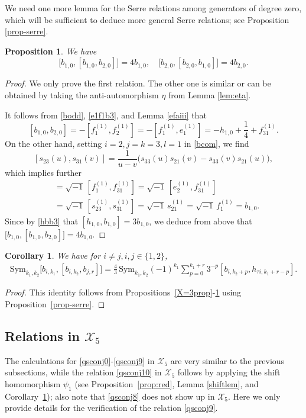 \documentclass[11pt,reqno]{amsart}
\numberwithin{equation}{section}
\newtheorem{prop}[thm]{Proposition}
\newtheorem{cor}[thm]{Corollary}
\theoremstyle{definition}
\theoremstyle{remark}
\newcommand{\scrX}{{\mathscr{X}}}
\begin{document}
We need one more lemma for the Serre relations among generators of degree zero, which will be sufficient to deduce more general Serre relations; see Proposition \ref{prop-serre}.
\begin{prop}\label{zeroserre}
We have
\[
\big[b_{1,0},[b_{1,0},b_{2,0}]\big]=4b_{1,0},\quad \big[b_{2,0},[b_{2,0},b_{1,0}]\big]=4b_{2,0}.
\]
\end{prop}
\begin{proof}
We only prove the first relation. The other one is similar or can be obtained by taking the anti-automorphism $\eta$ from Lemma \ref{lem:eta}.

It follows from  \eqref{bodd}, \eqref{e1f1b3}, and Lemma \ref{efaiii} that
\[
[b_{1,0},b_{2,0}]=-[f_1^{(1)},f_2^{(1)}]=-[f_1^{(1)},e_1^{(1)}]=-h_{1,0}+\frac{1}4+f_{31}^{(1)}.
\]
On the other hand, setting $i=2,j=k=3,l=1$ in \eqref{bcom}, we find
\[
[s_{23}(u),s_{31}(v)]=\frac{1}{u-v}\big(s_{33}(u)s_{21}(v)-s_{33}(v)s_{21}(u)\big),
\]
which implies further
\begin{align*}
[b_{1,0},f_{31}^{(1)}]&=\sqrt{-1}\,[f_{1}^{(1)},f_{31}^{(1)}]=\sqrt{-1}\,[e_{2}^{(1)},f_{31}^{(1)}]\\&=\sqrt{-1}\,[s_{23}^{(1)},s_{31}^{(1)}]=\sqrt{-1}\,s_{21}^{(1)} =\sqrt{-1}\,f_1^{(1)}=b_{1,0}.
\end{align*}
Since by \eqref{hbb3} that $[h_{1,0},b_{1,0}]=3b_{1,0}$, we deduce from above that $\big[b_{1,0},[b_{1,0},b_{2,0}]\big]=4b_{1,0}$.
\end{proof}

\begin{cor}\label{X=3cor}
We have for $i\neq j, i,j\in \{1,2\}$,
\begin{align*}
\mathrm{Sym}_{k_1,k_2}\big[b_{i,k_1},[b_{i,k_2},b_{j,r}] \big] =\frac{4}{3}\,\mathrm{Sym}_{k_1,k_2}(-1)^{k_1}\sum_{p=0}^{k_1+r}3^{-p}[b_{i,k_2+p},h_{\tau i,k_1+r-p}].
\end{align*}
\end{cor}

\begin{proof}
This identity follows from Propositions~\ref{X=3prop}-\ref{zeroserre} using Proposition~\ref{prop-serre}.
\end{proof}

\subsection{Relations in $\scrX_5$} The calculations for \eqref{qsconj0}-\eqref{qsconj9} in $\scrX_5$ are very similar to the previous subsections, while the relation \eqref{qsconj10} in $\scrX_5$ follows by applying the shift homomorphism $\psi_1$ (see Proposition~\ref{prop:red}, Lemma \ref{shiftlem}, and Corollary~\ref{X=3cor}); also note that \eqref{qsconj8} does not show up in $\scrX_5$. Here we only provide details for the verification of the relation \eqref{qsconj9}.
\end{document}
